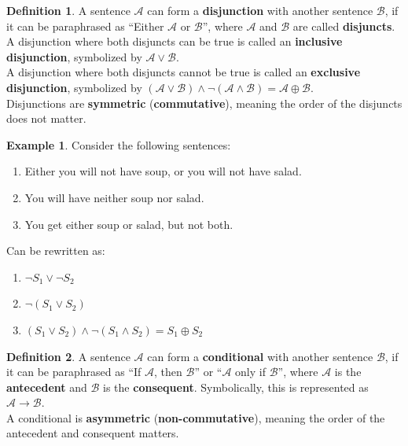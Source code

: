 \documentclass{tufte-handout}
\theoremstyle{definition}
\newtheorem{defn}{Definition}
\theoremstyle{example}
\newtheorem{exmp}{Example}
\theoremstyle{remark}
\newtheorem{rem}{Remark}
\begin{document}
\begin{framed}
  \begin{defn}
    A sentence $\mathcal{A}$ can form a \textbf{disjunction} with another sentence $\mathcal{B}$, if it can be paraphrased as ``Either $\mathcal{A}$ or $\mathcal{B}$'', where $\mathcal{A}$ and $\mathcal{B}$ are called \textbf{disjuncts}. \\[1em]
    A disjunction where both disjuncts can be true is called an \textbf{inclusive disjunction}, symbolized by $\mathcal{A} \lor \mathcal{B}$.\\[1em]
    A disjunction where both disjuncts cannot be true is called an \textbf{exclusive disjunction}, symbolized by $(\mathcal{A} \lor \mathcal{B}) \land \neg (\mathcal{A} \land \mathcal{B}) = \mathcal{A} \oplus \mathcal{B}$. \\[1em]
    Disjunctions are \textbf{symmetric} (\textbf{commutative}), meaning the order of the disjuncts does not matter.
  \end{defn}
\end{framed}
\begin{exmp}
  Consider the following sentences:
  \begin{enumerate}[leftmargin=3\parindent]
    \item Either you will not have soup, or you will not have salad.
    \item You will have neither soup nor salad.
    \item You get either soup or salad, but not both.
  \end{enumerate}
  Can be rewritten as:
  \begin{enumerate}[leftmargin=3\parindent]
    \item $\neg S_1 \lor \neg S_2$
    \item $\neg (S_1 \lor S_2)$
    \item $(S_1 \lor S_2) \land \neg (S_1 \land S_2) = S_1 \oplus S_2$
  \end{enumerate}
\end{exmp}
\begin{framed}
  \begin{defn}
    A sentence $\mathcal{A}$ can form a \textbf{conditional} with another sentence $\mathcal{B}$, if it can be paraphrased as ``If $\mathcal{A}$, then $\mathcal{B}$'' or ``$\mathcal{A}$ only if $\mathcal{B}$'', where $\mathcal{A}$ is the \textbf{antecedent} and $\mathcal{B}$ is the \textbf{consequent}. Symbolically, this is represented as $\mathcal{A} \to \mathcal{B}$. \\[1em]
    A conditional is \textbf{asymmetric} (\textbf{non-commutative}), meaning the order of the antecedent and consequent matters.
  \end{defn}
\end{framed}
\end{document}
